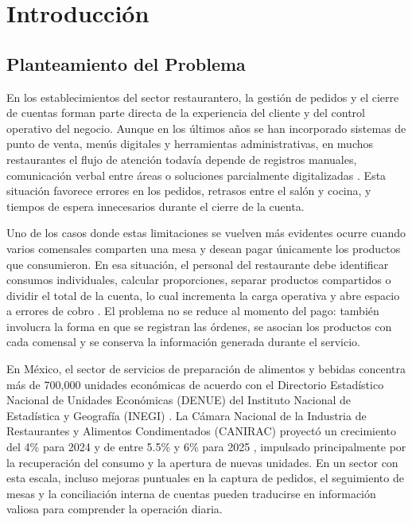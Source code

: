 \section{Introducción}

\subsection{Planteamiento del Problema}

En los establecimientos del sector restaurantero, la gestión de pedidos y el cierre de
cuentas forman parte directa de la experiencia del cliente y del control operativo del
negocio. Aunque en los últimos años se han incorporado sistemas de punto de venta,
menús digitales y herramientas administrativas, en muchos restaurantes el flujo de
atención todavía depende de registros manuales, comunicación verbal entre áreas o
soluciones parcialmente digitalizadas \cite{toast_success_2023, nra_state_2023}. Esta
situación favorece errores en los pedidos, retrasos entre el salón y cocina, y tiempos
de espera innecesarios durante el cierre de la cuenta.

Uno de los casos donde estas limitaciones se vuelven más evidentes ocurre cuando varios
comensales comparten una mesa y desean pagar únicamente los productos que consumieron.
En esa situación, el personal del restaurante debe identificar consumos individuales,
calcular proporciones, separar productos compartidos o dividir el total de la cuenta,
lo cual incrementa la carga operativa y abre espacio a errores de cobro
\cite{lee_digital_2024, tan_tabletop_2020}. El problema no se reduce al momento del
pago: también involucra la forma en que se registran las órdenes, se asocian los
productos con cada comensal y se conserva la información generada durante el servicio.

En México, el sector de servicios de preparación de alimentos y bebidas concentra más de
700{,}000 unidades económicas de acuerdo con el Directorio Estadístico Nacional de
Unidades Económicas (DENUE) del Instituto Nacional de Estadística y Geografía (INEGI)
\cite{inegi_denue_2024}. La Cámara Nacional de la Industria de Restaurantes y Alimentos
Condimentados (CANIRAC) proyectó un crecimiento del 4\% para 2024
\cite{inegi_canirac_2023} y de entre 5.5\% y 6\% para 2025
\cite{ramirez_canirac_2025}, impulsado principalmente por la recuperación del consumo y
la apertura de nuevas unidades. En un sector con esta escala, incluso mejoras puntuales
en la captura de pedidos, el seguimiento de mesas y la conciliación interna de cuentas
pueden traducirse en información valiosa para comprender la operación diaria.

